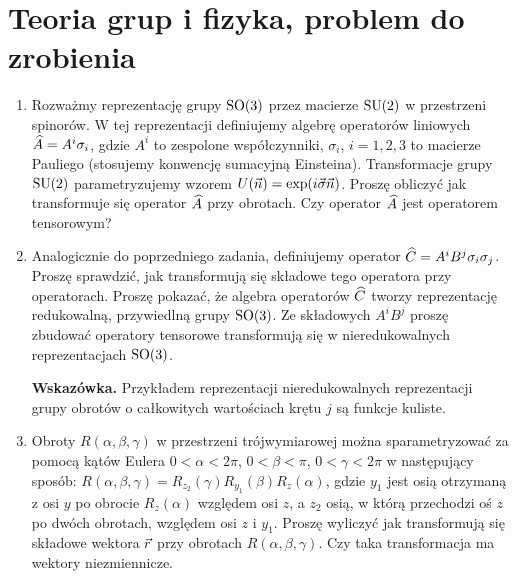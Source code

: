 \documentclass[a4paper,11pt]{article}
\begin{document}
\section{Teoria grup i fizyka, problem do zrobienia}




\begin{enumerate}

\item Rozważmy reprezentację grupy $\mathrm{SO}( 3 )$ przez macierze
  $\mathrm{SU}( 2 )$ w przestrzeni spinorów. W tej reprezentacji definiujemy
  algebrę operatorów liniowych $\widehat{A} = A^{ i } \sigma_{ i }$, gdzie
  $A^{ i }$ to zespolone współczynniki, $\sigma_{ i }$, $i = 1, 2, 3$ to
  macierze Pauliego (stosujemy konwencję sumacyjną Einsteina).
  Transformacje grupy $\mathrm{SU}( 2 )$ parametryzujemy wzorem
  $U( \vec{ n } ) = \exp( i \vec{ \sigma } \vec{ n } )$. Proszę obliczyć jak
  transformuje się operator $\widehat{A}$ przy obrotach. Czy operator
  $\widehat{A}$ jest operatorem tensorowym?

\item Analogicznie do poprzedniego zadania, definiujemy operator
  $\widehat{C} = A^{ i } B^{ j } \sigma_{ i } \sigma_{ j }$. Proszę sprawdzić,
  jak transformują się składowe tego operatora przy operatorach.
  Proszę pokazać, że algebra operatorów $\widehat{C}$ tworzy
  reprezentację redukowalną, przywiedlną grupy $\mathrm{SO}( 3 )$. Ze
  składowych $A^{ i } B^{ j }$ proszę zbudować operatory tensorowe
  transformują się w nieredukowalnych reprezentacjach $\mathrm{SO}( 3 )$.

  \textbf{Wskazówka.} Przykładem reprezentacji nieredukowalnych
  reprezentacji grupy obrotów o całkowitych wartościach krętu $j$ są
  funkcje kuliste.

\item Obroty $R( \alpha, \beta, \gamma )$ w przestrzeni trójwymiarowej można
  sparametryzować za pomocą kątów Eulera $0 < \alpha < 2\pi$,
  $0 < \beta < \pi$, $0 < \gamma < 2\pi$ w następujący sposób:
  $R( \alpha, \beta, \gamma ) = R_{ z_{ 2 } }( \gamma ) R_{ y_{ 1 } }( \beta ) R_{ z }( \alpha )$,
  gdzie $y_{ 1 }$ jest osią otrzymaną z osi $y$ po obrocie
  $R_{ z }( \alpha )$ względem osi $z$, a $z_{ 2 }$ osią, w którą
  przechodzi oś $z$ po dwóch obrotach, względem osi $z$ i $y_{ 1 }$.
  Proszę wyliczyć jak transformują się składowe wektora $\vec{ r }$ przy
  obrotach $R( \alpha, \beta, \gamma )$. Czy taka transformacja ma wektory
  niezmiennicze.


\end{enumerate}
\end{document}
